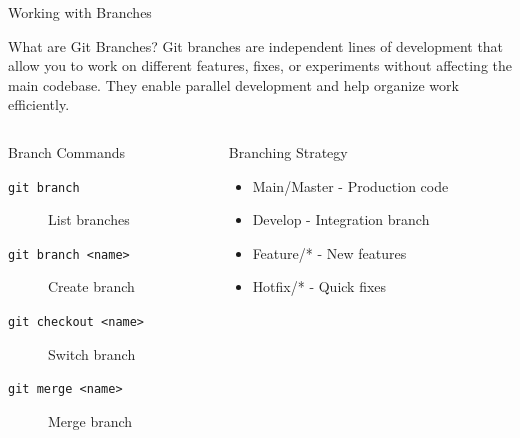 \documentclass[aspectratio=169]{beamer}
\begin{document}
\begin{frame}{Working with Branches}
  \begin{block}{What are Git Branches?}
    Git branches are independent lines of development that allow you to work on different features, fixes, or experiments without affecting the main codebase. They enable parallel development and help organize work efficiently.
  \end{block}

  \begin{columns}
    \begin{column}{0.48\textwidth}
      \begin{block}{Branch Commands}
        \begin{description}
          \item[\texttt{git branch}] List branches
          \item[\texttt{git branch <name>}] Create branch
          \item[\texttt{git checkout <name>}] Switch branch
          \item[\texttt{git merge <name>}] Merge branch
        \end{description}
      \end{block}
    \end{column}
    
    \begin{column}{0.48\textwidth}
      \begin{exampleblock}{Branching Strategy}
        \begin{itemize}
          \item Main/Master - Production code
          \item Develop - Integration branch
          \item Feature/* - New features
          \item Hotfix/* - Quick fixes
        \end{itemize}
      \end{exampleblock}
    \end{column}
  \end{columns}
  
  \vspace{1em}

\end{frame}
\end{document}

